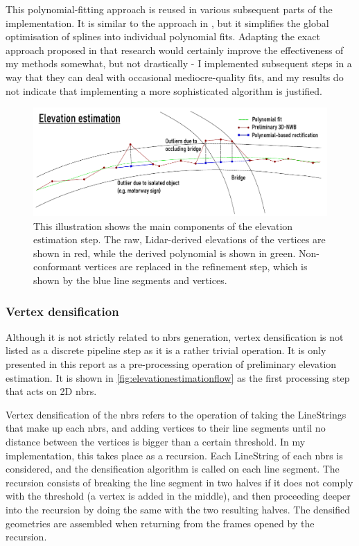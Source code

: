 This polynomial-fitting approach is reused in various subsequent parts of the implementation. It is similar to the approach in \cite{boyko_funkhauser_2011}, but it simplifies the global optimisation of splines into individual polynomial fits. Adapting the exact approach proposed in that research would certainly improve the effectiveness of my methods somewhat, but not drastically - I implemented subsequent steps in a way that they can deal with occasional mediocre-quality fits, and my results do not indicate that implementing a more sophisticated algorithm is justified.

\begin{figure}
    \centering
    \includegraphics[width=\linewidth]{final_report/figs/elevation_estimation_illu.pdf}
    \caption[Illustration of the elevation estimation step]{This illustration shows the main components of the elevation estimation step. The raw, Lidar-derived elevations of the vertices are shown in red, while the derived polynomial is shown in green. Non-conformant vertices are replaced in the refinement step, which is shown by the blue line segments and vertices.}
    \label{fig:elevationestimation_illu}
\end{figure}

\subsubsection{Vertex densification}

Although it is not strictly related to \ac{nbrs} generation, vertex densification is not listed as a discrete pipeline step as it is a rather trivial operation. It is only presented in this report as a pre-processing operation of preliminary elevation estimation. It is shown in \ref{fig:elevationestimationflow} as the first processing step that acts on 2D \ac{nbrs}.

Vertex densification of the \ac{nbrs} refers to the operation of taking the LineStrings that make up each \ac{nbrs}, and adding vertices to their line segments until no distance between the vertices is bigger than a certain threshold. In my implementation, this takes place as a recursion. Each LineString of each \ac{nbrs} is considered, and the densification algorithm is called on each line segment. The recursion consists of breaking the line segment in two halves if it does not comply with the threshold (a vertex is added in the middle), and then proceeding deeper into the recursion by doing the same with the two resulting halves. The densified geometries are assembled when returning from the frames opened by the recursion.

